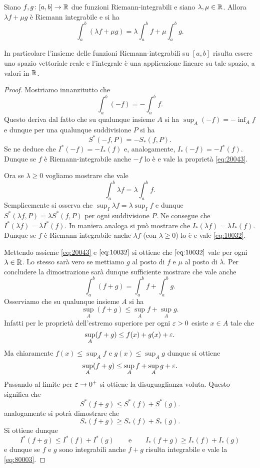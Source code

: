 \begin{theorem}
\mymark{*}
\label{th:integrale_lineare}
Siano $f,g\colon [a,b]\to {\mathbb R}$ due funzioni Riemann-integrabili
e siano $\lambda, \mu \in {\mathbb R}$. Allora $\lambda f + \mu g$
è Riemann integrabile e si ha
\[
  \int_a^b (\lambda f + \mu g) = \lambda \int_a^b f + \mu \int_a^b g.
\]

In particolare l'insieme delle funzioni Riemann-integrabili su $[a,b]$ risulta
essere uno spazio vettoriale reale e l'integrale è una
applicazione lineare su tale spazio, a valori in ${\mathbb R}$.
\end{theorem}
%
\begin{proof}
\mymark{*}
Mostriamo innanzitutto che
\begin{equation}\label{eq:20043}
  \int_a^b (-f) = -\int_a^b f.
\end{equation}
Questo deriva dal fatto che su qualunque insieme $A$ si ha
$\sup_A (-f) = -\inf_A f$ e dunque per una qualunque suddivisione $P$
si ha
\[
  S^*(-f,P) = -S_*(f,P).
\]
Se ne deduce che $I^*(-f) = -I_*(f)$ e, analogamente, $I_*(-f) = -I^*(f)$.
Dunque se $f$ è Riemann-integrabile anche $-f$ lo è e vale la proprietà \eqref{eq:20043}.

Ora se $\lambda \ge 0$ vogliamo mostrare che vale
\begin{equation}\label{eq:10032}
  \int_a^b \lambda f = \lambda \int_a^b f.
\end{equation}
Semplicemente si osserva che $\sup_I \lambda f = \lambda \sup_I f$ e dunque
$S^*(\lambda f,P) = \lambda S^*(f,P)$ per ogni suddivisione $P$.
Ne consegue che $I^*(\lambda f) = \lambda I^*(f)$. In maniera analoga si può
mostrare che $I_*(\lambda f) = \lambda I_*(f)$. Dunque se $f$ è
Riemann-integrabile anche $\lambda f$ (con $\lambda \ge 0$) lo è e vale \eqref{eq:10032}.

Mettendo assieme \eqref{eq:20043} e $\eqref{eq:10032}$ si ottiene
che $\eqref{eq:10032}$ vale per ogni $\lambda \in {\mathbb R}$.
Lo stesso sarà vero se mettiamo $g$ al posto di $f$ e $\mu$ al posto di $\lambda$.
Per concludere la dimostrazione sarà dunque sufficiente
mostrare che vale anche
\begin{equation*}\label{eq:80003}
\int_a^b (f+g) = \int_a^b f + \int_a^b g.
\end{equation*}
Osserviamo che su qualunque insieme $A$ si ha
\[
  \sup_A (f+g) \le \sup_A f + \sup_A g.
\]
Infatti per le proprietà dell'estremo superiore per ogni $\varepsilon>0$ esiste $x\in A$ tale che
\[
  \sup_A (f+g) \le f(x) + g(x) + \varepsilon.
\]
Ma chiaramente $f(x) \le \sup_A f$ e $g(x)\le \sup_A g$ dunque si ottiene
\[
  \sup_A (f+g) \le \sup_A f + \sup_A g + \varepsilon.
\]
Passando al limite per $\varepsilon \to 0^+$ si ottiene la disuguaglianza voluta.
Questo significa che
\[
  S^*(f+g) \le S^*(f) + S^*(g).
\]
analogamente si potrà dimostrare che
\[
  S_*(f+g) \ge S_*(f) + S_*(g).
\]
Si ottiene dunque
\[
  I^*(f+g) \le I^*(f) + I^*(g)
  \qquad\text{e}\qquad
  I_*(f+g) \ge I_*(f) + I_*(g)
\]
e dunque se $f$ e $g$ sono integrabili anche $f+g$ risulta integrabile
e vale la \eqref{eq:80003}.


\end{proof}
